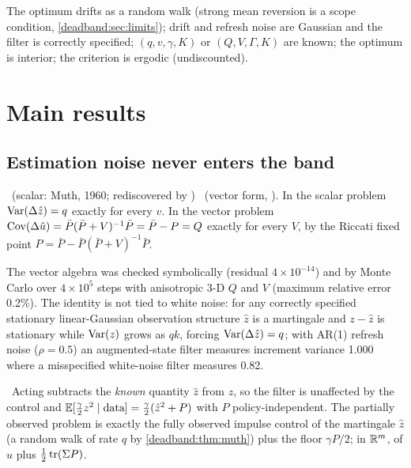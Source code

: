 \begin{assumption}
\label{deadband:ass:main}
The optimum drifts as a random walk (strong mean reversion is a scope condition, \cref{deadband:sec:limits}); drift and refresh noise are Gaussian and the filter is correctly specified; $(q, v, \gamma, K)$ or $(Q, V, \Gamma, K)$ are known; the optimum is interior; the criterion is ergodic (undiscounted).
\end{assumption}

\section{Main results}

\subsection{Estimation noise never enters the band}

\begin{theorem}
\label{deadband:thm:muth}
\tagTransported\ (scalar: Muth, 1960; rediscovered by ) \tagEstablished\ (vector form, ). In the scalar problem $\operatorname{Var}(\Delta\hat z) = q$ exactly for every $v$. In the vector problem $\operatorname{Cov}(\Delta\hat u) = \bar P(\bar P+V)^{-1}\bar P = \bar P - P = Q$ exactly for every $V$, by the Riccati fixed point $P = \bar P - \bar P(\bar P+V)^{-1}\bar P$.
\end{theorem}

The vector algebra was checked symbolically (residual $4\times10^{-14}$) and by Monte Carlo over $4\times10^5$ steps with anisotropic 3-D $Q$ and $V$ (maximum relative error 0.2\%). The identity is not tied to white noise: for any correctly specified stationary linear-Gaussian observation structure $\hat z$ is a martingale and $z - \hat z$ is stationary while $\operatorname{Var}(z)$ grows as $qk$, forcing $\operatorname{Var}(\Delta\hat z) = q$; with AR(1) refresh noise ($\rho = 0.5$) an augmented-state filter measures increment variance 1.000 where a misspecified white-noise filter measures 0.82.

\begin{proposition}
\label{deadband:prop:separation}
\tagEstablished\ Acting subtracts the \emph{known} quantity $\hat z$ from $z$, so the filter is unaffected by the control and $\mathbb{E}[\tfrac{\gamma}{2}z^2 \mid \text{data}] = \tfrac{\gamma}{2}(\hat z^2 + P)$ with $P$ policy-independent. The partially observed problem is exactly the fully observed impulse control of the martingale $\hat z$ (a random walk of rate $q$ by \cref{deadband:thm:muth}) plus the floor $\gamma P/2$; in $\mathbb{R}^m$, of $\hat u$ plus $\tfrac12\operatorname{tr}(\Sigma P)$.
\end{proposition}

